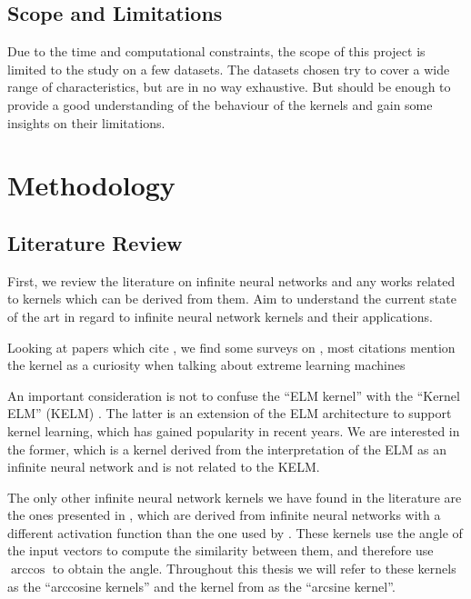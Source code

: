 \subsection{Scope and Limitations}%
\label{sub:scope_and_limitations}

Due to the time and computational constraints, the scope of this project is
limited to the study on a few datasets. The datasets chosen try to cover a wide
range of characteristics, but are in no way exhaustive. But should be enough to
provide a good understanding of the behaviour of the kernels and gain some
insights on their limitations.

\section{Methodology}

\subsection{Literature Review}%
\label{sub:literature_review}

First, we review the literature on infinite neural networks and any works
related to kernels which can be derived from them. Aim to understand the
current state of the art in regard to infinite neural network kernels and
their applications.

Looking at papers which cite
\textcite{frenayParameterinsensitiveKernelExtreme2011}, we find some surveys
on \cite{huangTrendsExtremeLearning2015,huangExtremeLearningMachines2011}, most
citations mention the kernel as a curiosity when talking about extreme learning
machines \cite{yuLearningDeepRepresentations2015}

An important consideration is not to confuse the ``ELM kernel'' with the
``Kernel ELM'' (KELM) \cite{huangExtremeLearningMachine2012}. The latter is an
extension of the ELM architecture to support kernel learning, which has gained
popularity in recent years. We are interested in the former, which is a kernel
derived from the interpretation of the ELM as an infinite neural network and is
not related to the KELM.

The only other infinite neural network kernels we have found in the literature
are the ones presented in \textcite{choLargemarginClassificationInfinite2010},
which are derived from infinite neural networks with a different activation
function than the one used by
\citeauthor{frenayParameterinsensitiveKernelExtreme2011}. These kernels
use the angle of the input vectors to compute the similarity between them,
and therefore use $\arccos$ to obtain the angle. Throughout this thesis
we will refer to these kernels as the ``arccosine kernels'' and the kernel
from \citeauthor{frenayParameterinsensitiveKernelExtreme2011} as the
``arcsine kernel''.

